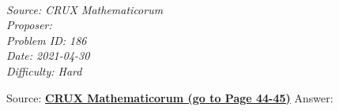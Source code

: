 \SSbreak\\
\emph{Source: CRUX Mathematicorum}\\
\emph{Proposer: \Pnjoy}\\ %
\emph{Problem ID: 186}\\
\emph{Date: 2021-04-30}\\
\emph{Difficulty: Hard}\\
\SSbreak

\bigskip

\begin{solution}\hfil\medskip
  
Source: \href{https://cms.math.ca/wp-content/uploads/crux-pdfs/CRUXv44n6.pdf}{\textbf{CRUX Mathematicorum (go to Page 44-45)}} Answer: 
\end{solution}\bigskip
